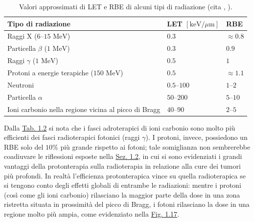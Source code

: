 \documentclass[12pt,a4paper,twoside]{report}
\begin{document}
	\begin{table}[H]
		\centering
		\begin{tabular}{ |m{8cm}||m{3cm}|m{1cm}| }
			\hline
			Tipo di radiazione & LET $\left[\mbox{keV/}\mu\mbox{m}\right]$ & RBE\\
			\hline\hline
			Raggi X ($6$--$15 \mbox{ MeV}$) & $0.3$ &	$\approx 0.8$\\
			\hline
			Particella $\beta$ ($1 \mbox{ MeV}$) & $0.3$ & $0.9$\\
			\hline
			Raggi $\gamma$ ($1 \mbox{ MeV}$) & $0.5$ & $1$\\
			\hline
			Protoni a energie terapiche ($150 \mbox{ MeV}$) & $0.5$ & $\approx1.1$\\
			\hline
			Neutroni & $0.5$--$100$ & $1$--$2$\\
			\hline
			Particella $\alpha$ & $50$--$200$ & $5$--$10$\\
			\hline
			Ioni carbonio nella regione vicina al picco di Bragg & $40$--$90$ & $2$--$5$\\
			\hline
		\end{tabular}
		\caption{Valori approssimati di LET e RBE di alcuni tipi di radiazione (cita
			,
			).}
		\label{tab:let_rbe}
	\end{table}
	
	Dalla \hyperref[tab:let_rbe]{Tab. 1.2} si nota che i fasci adroterapici di ioni carbonio sono molto più efficienti dei fasci radioterapici fotonici (raggi $\gamma$). I protoni, invece, possiedono un RBE solo del $10\%$ più grande rispetto ai fotoni; tale somiglianza non sembrerebbe coadiuvare le riflessioni esposte nella \hyperref[sec:1.2]{Sez. 1.2}, in cui si sono evidenziati i grandi vantaggi della protonterapia sulla radioterapia in relazione alla cure dei tumori più profondi. In realtà l'efficienza protonterapica vince su quella radioterapica se si tengono conto degli effetti globali di entrambe le radiazioni: mentre i protoni (così come gli ioni carbonio) rilasciano la maggior parte della dose in una zona ristretta situata in prossimità del picco di Bragg, i fotoni rilasciano la dose in una regione molto più ampia, come evidenziato nella \hyperref[fig:photon]{Fig. 1.17}.
	
\end{document}

